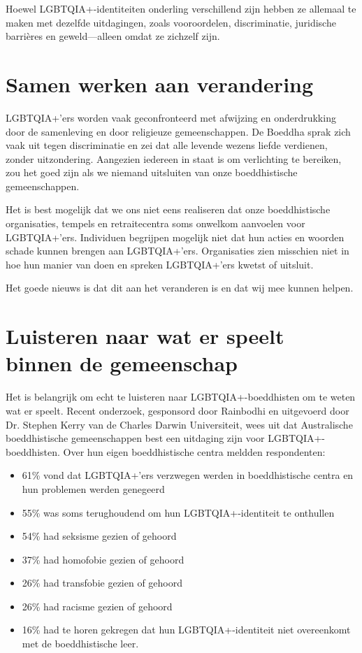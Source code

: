 \documentclass[12pt,openany]{book}
\begin{document}
Hoewel LGBTQIA+-identiteiten onderling verschillend zijn hebben ze allemaal te maken met dezelfde uitdagingen, zoals vooroordelen, discriminatie, juridische barrières en geweld—alleen omdat ze zichzelf zijn.

\section*{Samen werken aan verandering}

LGBTQIA+'ers worden vaak geconfronteerd met afwijzing en onderdrukking door de samenleving en door religieuze gemeenschappen. De Boeddha  sprak zich vaak uit tegen discriminatie en zei dat alle levende wezens liefde verdienen, zonder uitzondering. Aangezien iedereen in staat is om verlichting te bereiken, zou het goed zijn als we niemand uitsluiten van onze boeddhistische gemeenschappen.  

Het is best mogelijk dat we ons niet eens realiseren dat onze boeddhistische organisaties, tempels en retraitecentra soms onwelkom aanvoelen voor LGBTQIA+'ers. Individuen begrijpen mogelijk niet dat hun acties en woorden schade kunnen brengen aan LGBTQIA+'ers. Organisaties zien misschien niet in hoe hun manier van doen en spreken LGBTQIA+'ers kwetst of uitsluit.  

Het goede nieuws is dat dit aan het veranderen is en dat wij mee kunnen helpen.

\section*{Luisteren naar wat er speelt binnen de gemeenschap}

Het is belangrijk om echt te luisteren naar LGBTQIA+-boeddhisten om te weten wat er speelt. Recent onderzoek, gesponsord door Rainbodhi en uitgevoerd door Dr. Stephen Kerry van de Charles Darwin Universiteit, wees uit dat Australische boeddhistische gemeenschappen best een uitdaging zijn voor LGBTQIA+-boeddhisten. Over hun eigen boeddhistische centra meldden respondenten:

\begin{itemize}
\setlength\itemsep{-0.3em}
  \item 61\% vond dat LGBTQIA+'ers verzwegen werden in boeddhistische centra en hun problemen werden genegeerd
  \item 55\% was soms terughoudend om hun LGBTQIA+-identiteit te onthullen
  \item 54\% had seksisme gezien of gehoord
  \item 37\% had homofobie gezien of gehoord
  \item 26\% had transfobie gezien of gehoord
  \item 26\% had racisme gezien of gehoord
  \item 16\% had te horen gekregen dat hun LGBTQIA+-identiteit niet overeenkomt met de boeddhistische leer.
\end{itemize}
\end{document}
